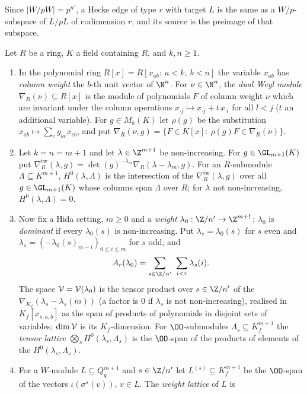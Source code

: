 Since $|W/pW|=p^{n'}$, a Hecke edge of type $r$ with target $L$ is the same as a $W/p$-subspace of $L/pL$ of
codimension $r$, and its source is the preimage of that subspace.

\begin{definition}\label{pf:linkG:weightlat}
Let $R$ be a ring, $K$ a field containing $R$, and $k,n\ge1$.
\begin{enumerate}[label=(\alph*)]
\item In the polynomial ring $R[x]=R[x_{ab}:\ a<k,\ b<n]$ the variable $x_{ab}$ has \emph{column weight} the
$b$-th unit vector of $\N^n$. For $\nu\in\N^n$, the \emph{dual Weyl module} $\nabla_R(\nu)\subseteq R[x]$ is the
module of polynomials $F$ of column weight $\nu$ which are invariant under the column operations
$x_{\cdot j}\mapsto x_{\cdot j}+t\,x_{\cdot l}$ for all $l<j$ ($t$ an additional variable). For
$g\in M_k(K)$ let $\rho(g)$ be the substitution $x_{ab}\mapsto\sum_{c}g_{ac}x_{cb}$, and put
$\nabla_R(\nu,g)=\{F\in K[x]:\ \rho(g)F\in\nabla_R(\nu)\}$.
\item Let $k=n=m+1$ and let $\lambda\in\Z^{m+1}$ be non-increasing. For $g\in\GL_{m+1}(K)$ put
$\nabla^{\mathrm{tw}}_R(\lambda,g)=\det(g)^{-\lambda_m}\nabla_R(\lambda-\lambda_m,g)$. For an $R$-submodule
$\Lambda\subseteq K^{m+1}$, $H^0(\lambda,\Lambda)$ is the intersection of the $\nabla^{\mathrm{tw}}_R(\lambda,g)$ over
all $g\in\GL_{m+1}(K)$ whose columns span $\Lambda$ over $R$; for $\lambda$ not non-increasing,
$H^0(\lambda,\Lambda)=0$.
\item Now fix a Hida setting, $m\ge0$ and a \emph{weight} $\lambda_0:\Z/n'\to\Z^{m+1}$; $\lambda_0$ is
\emph{dominant} if every $\lambda_0(s)$ is non-increasing. Put $\lambda_s=\lambda_0(s)$ for $s$ even and
$\lambda_s=(-\lambda_0(s)_{m-i})_{0\le i\le m}$ for $s$ odd, and
\[
A_r(\lambda_0)=\sum_{s\in\Z/n'}\ \sum_{i<r}\lambda_s(i).
\]
The space $\mathcal V=\mathcal V(\lambda_0)$ is the tensor product over $s\in\Z/n'$ of the
$\nabla_{K_f}(\lambda_s-\lambda_s(m))$ (a factor is $0$ if $\lambda_s$ is not non-increasing), realised in
$K_f[x_{s,a,b}]$ as the span of products of polynomials in
disjoint sets of variables; $\dim\mathcal V$ is its $K_f$-dimension. For $\OO$-submodules $\Lambda_s\subseteq
K_f^{m+1}$ the \emph{tensor lattice} $\bigotimes_sH^0(\lambda_s,\Lambda_s)$ is the $\OO$-span of the products of
elements of the $H^0(\lambda_s,\Lambda_s)$.
\item For a $W$-module $L\subseteq Q_q^{m+1}$ and $s\in\Z/n'$ let $L^{(s)}\subseteq K_f^{m+1}$ be the $\OO$-span of
the vectors $\iota(\sigma^s(v))$, $v\in L$. The \emph{weight lattice} of $L$ is

\end{enumerate}
\end{definition}

